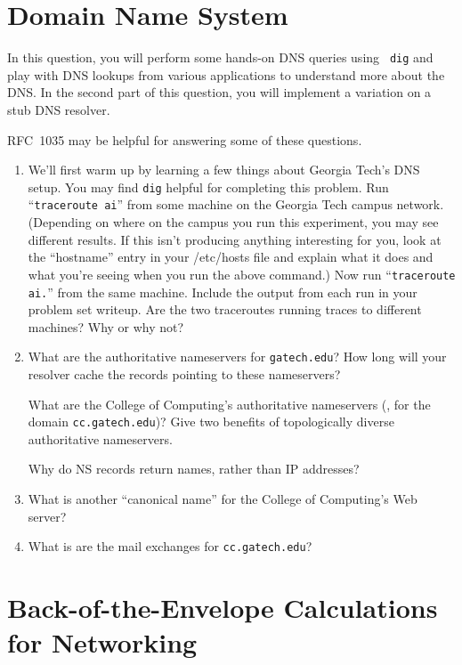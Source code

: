 \documentclass[11pt]{article}
\begin{document}
\section{Domain Name System}


In this question, you will perform some hands-on DNS queries using {\tt
  dig} and play with DNS lookups from various applications to understand
more about the DNS.  In the second part of this question, you will
implement a variation on a stub DNS resolver.

RFC~1035 may be helpful for answering some of these questions.  


\begin{enumerate}
\item We'll first warm up by learning a few things about Georgia Tech's
  DNS setup.  You may find {\tt dig} helpful for completing this
  problem. Run ``{\tt traceroute ai}'' from some machine on the Georgia
  Tech campus network. (Depending on where on the campus you run this
  experiment, you may see different results.  If this isn't producing
  anything interesting for you, look at the ``hostname'' entry in your
  /etc/hosts file and explain what it does and what you're seeing when
  you run the above command.) Now run ``{\tt traceroute ai.}'' from the
  same machine.  Include the output from each run in your problem set
  writeup.  Are the two traceroutes running traces to different
  machines?  Why or why not?

\item What are the authoritative nameservers for {\tt gatech.edu}?  How
  long will your resolver cache the records pointing to these
  nameservers?  

  What are the College of Computing's authoritative nameservers (\ie, for
  the domain {\tt cc.gatech.edu})?  Give two benefits of topologically
  diverse authoritative nameservers.

  Why do NS records return names, rather than IP addresses?

\item What is another ``canonical name'' for the College of Computing's
  Web server?  

\item What is are the mail exchanges for {\tt cc.gatech.edu}?
\end{enumerate}


\section{Back-of-the-Envelope Calculations for Networking}
\end{document}
